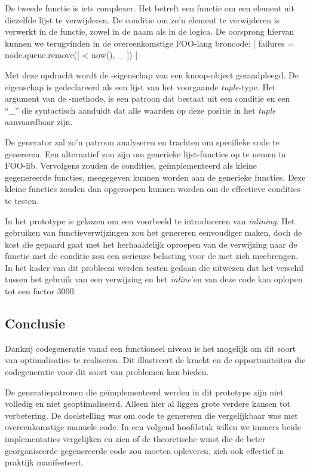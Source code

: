 De tweede functie is iets complexer. Het betreft een functie om een element uit
diezelfde lijst te verwijderen. De conditie om zo'n element te verwijderen is
verwerkt in de functie, zowel in de naam als in de logica. De oorsprong hiervan
kunnen we terugvinden in de overeenkomstige FOO-lang broncode:
| failures = node.queue.remove([ < now(), _ ]) |

Met deze opdracht wordt de -eigenschap van een knoop-object
geraadpleegd. De eigenschap is gedeclareerd als een lijst van het voorgaande
\emph{tuple}-type. Het argument van de -methode, is een patroon dat
bestaat uit een conditie  en een ``\_'' die syntactisch aanduidt
dat alle waarden op deze positie in het \emph{tuple} aanvaardbaar zijn.

De generator zal zo'n patroon analyseren en trachten om specifieke code te
genereren. Een alternatief zou zijn om generieke lijst-functies op te nemen in
FOO-lib. Vervolgens zouden de condities, ge\"implementeerd als kleine
gegenereerde functies, meegegeven kunnen worden aan de generieke functies. Deze
kleine functies zouden dan opgeroepen kunnen worden om de effectieve condities
te testen.

In het prototype is gekozen om een voorbeeld te introduceren van
\emph{inlining}. Het gebruiken van functieverwijzingen zou het genereren
eenvoudiger maken, doch de kost die gepaard gaat met het herhaaldelijk oproepen
van de verwijzing naar de functie met de conditie zou een serieuze belasting
voor de \mcu met zich meebrengen. In het kader van dit probleem werden testen
gedaan die uitwezen dat het verschil tussen het gebruik van een verwijzing en
het \emph{inline}'en van deze code kan oplopen tot een factor 3000.

\subsection{Conclusie}

Dankzij codegeneratie vanaf een functioneel niveau is het mogelijk om dit soort
van optimalisaties te realiseren. Dit illustreert de kracht en de
opportuniteiten die codegeneratie voor dit soort van problemen kan bieden.

De generatiepatronen die ge\"implementeerd werden in dit prototype zijn niet
volledig en niet geoptimaliseerd. Alleen hier al liggen grote verdere kansen
tot verbetering. De doelstelling was om code te genereren die vergelijkbaar was
met overeenkomstige manuele code. In een volgend hoofdstuk willen we immers
beide implementaties vergelijken en zien of de theoretische winst die de beter
georganiseerde gegenereerde code zou moeten opleveren, zich ook effectief in
praktijk manifesteert.
